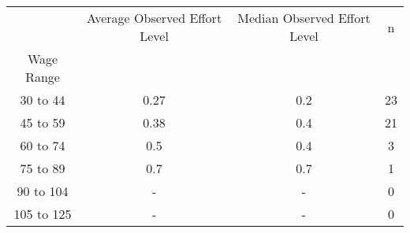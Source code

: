 \begin{tabular}{cccc}
\toprule
{} & Average Observed Effort Level & Median Observed Effort Level &   n \\
Wage Range &                               &                              &     \\
\midrule
30 to 44   &                          0.27 &                          0.2 &  23 \\
45 to 59   &                          0.38 &                          0.4 &  21 \\
60 to 74   &                           0.5 &                          0.4 &   3 \\
75 to 89   &                           0.7 &                          0.7 &   1 \\
90 to 104  &                             - &                            - &   0 \\
105 to 125 &                             - &                            - &   0 \\
\bottomrule
\end{tabular}
